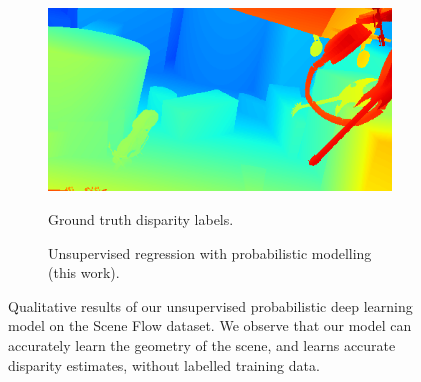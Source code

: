 \begin{figure}[p]
\begin{center}
\begin{subfigure}[t]{\linewidth}
{			\includegraphics[width=0.25\linewidth]{uncertainty/scene_flow_unsupervised/83_gt.png}}
	        \caption{Ground truth disparity labels.}
		\end{subfigure}
    	\begin{subfigure}[t]{\linewidth}
	        \caption{Unsupervised regression with probabilistic modelling (this work).}
            \label{fig:qual_smooth}
		\end{subfigure}
	\end{center}
	\caption[Qualitative results of our unsupervised probabilistic deep learning model.]{Qualitative results of our unsupervised probabilistic deep learning model on the Scene Flow dataset. We observe that our model can accurately learn the geometry of the scene, and learns accurate disparity estimates, without labelled training data.}
	\label{fig:results_qualitative_unsupervised}
    

\end{figure}
